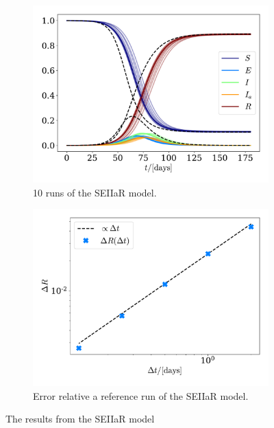 \documentclass{article}
\begin{document}
    \begin{figure}[H]
        \centering
        \begin{subfigure}{.49\textwidth}
            \includegraphics[width=\textwidth]{../plots/2C/TestSEIIaR.pdf}
            \caption{10 runs of the SEIIaR model.}
            \label{SEIIaR}
        \end{subfigure}
        \begin{subfigure}{.49\textwidth}
            \includegraphics[width=\textwidth]{../plots/2C/conv.pdf}
            \caption{Error relative a reference run of the SEIIaR model.}
            \label{SEIIaR conv}
        \end{subfigure}
        \caption{The results from the SEIIaR model}
    \end{figure}
\end{document}

